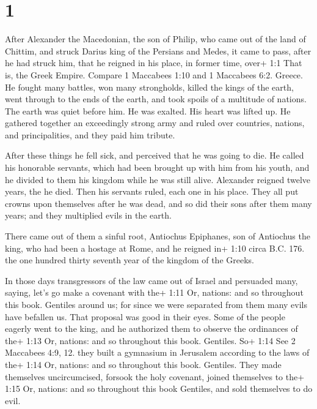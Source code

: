 \hypertarget{section}{%
\section{1}\label{section}}

 After Alexander the Macedonian, the son of Philip, who came
out of the land of Chittim, and struck Darius king of the Persians and
Medes, it came to pass, after he had struck him, that he reigned in his
place, in former time, over+ 1:1 That is, the Greek Empire. Compare 1
Maccabees 1:10 and 1 Maccabees 6:2. Greece.  He fought many
battles, won many strongholds, killed the kings of the earth,
 went through to the ends of the earth, and took spoils of a
multitude of nations. The earth was quiet before him. He was exalted.
His heart was lifted up.  He gathered together an
exceedingly strong army and ruled over countries, nations, and
principalities, and they paid him tribute.

 After these things he fell sick, and perceived that he was
going to die.  He called his honorable servants, which had
been brought up with him from his youth, and he divided to them his
kingdom while he was still alive.  Alexander reigned twelve
years, the he died.  Then his servants ruled, each one in
his place.  They all put crowns upon themselves after he was
dead, and so did their sons after them many years; and they multiplied
evils in the earth.

 There came out of them a sinful root, Antiochus Epiphanes,
son of Antiochus the king, who had been a hostage at Rome, and he
reigned in+ 1:10 circa B.C. 176. the one hundred thirty seventh year of
the kingdom of the Greeks.

 In those days transgressors of the law came out of Israel
and persuaded many, saying, let's go make a covenant with the+ 1:11 Or,
nations: and so throughout this book. Gentiles around us; for since we
were separated from them many evils have befallen us.  That
proposal was good in their eyes.  Some of the people
eagerly went to the king, and he authorized them to observe the
ordinances of the+ 1:13 Or, nations: and so throughout this book.
Gentiles.  So+ 1:14 See 2 Maccabees 4:9, 12. they built a
gymnasium in Jerusalem according to the laws of the+ 1:14 Or, nations:
and so throughout this book. Gentiles.  They made
themselves uncircumcised, forsook the holy covenant, joined themselves
to the+ 1:15 Or, nations: and so throughout this book Gentiles, and sold
themselves to do evil.

